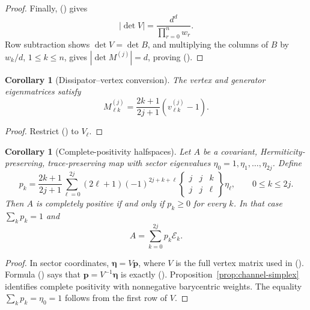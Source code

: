 \documentclass[twoside,10pt]{article}
\numberwithin{equation}{section}
\theoremstyle{slbody}
\newtheorem{corollary}[theorem]{Corollary}
\theoremstyle{definition}
\theoremstyle{remark}
\newcommand{\cE}{\mathcal E}
\renewcommand{\eqref}[1]{%
  \textup{{\normalfont(\oldstylenums{\ref{#1}}}\normalfont)}}
\begin{document}
\begin{proof}
Finally, \eqref{eq:V-factorization} gives
\begin{equation*}
 |\det V|=\frac{d^d}{\prod_{r=0}^nw_r}.
\end{equation*}
Row subtraction shows \(\det V=\det B\), and multiplying the
columns of \(B\) by \(w_k/d\), \(1\leq k\leq n\), gives
\(|\det M^{(j)}|=d\), proving \eqref{eq:M-determinant-magnitude}.
\end{proof}

\begin{corollary}[Dissipator--vertex conversion]
\label{cor:dissipator-vertex-conversion}
The vertex and generator eigenmatrices satisfy
\begin{equation}\label{eq:M-from-vertices}
 M^{(j)}_{\ell k}=\frac{2k+1}{2j+1}(v^{(j)}_{\ell k}-1).
\end{equation}
\end{corollary}

\begin{proof}
Restrict \eqref{eq:dissipator-vertex} to \(V_\ell\).
\end{proof}

\begin{corollary}[Complete-positivity halfspaces]
\label{cor:cp-halfspaces}
Let \(A\) be a covariant, Hermiticity-preserving, trace-preserving
map with sector eigenvalues
\(\eta_0=1,\eta_1,\ldots,\eta_{2j}\).  Define
\begin{equation}\label{eq:barycentric-weights}
 p_k=\frac{2k+1}{2j+1}
 \sum_{\ell=0}^{2j}(2\ell+1)(-1)^{2j+k+\ell}
 \begin{Bmatrix}j&j&k\\j&j&\ell\end{Bmatrix}\eta_\ell,
 \qquad 0\leq k\leq2j.
\end{equation}
Then \(A\) is completely positive if and only if \(p_k\geq0\) for
every \(k\).  In that case \(\sum_kp_k=1\) and
\begin{equation}\label{eq:channel-barycentric-decomposition}
 A=\sum_{k=0}^{2j}p_k\cE_k.
\end{equation}
\end{corollary}

\begin{proof}
In sector coordinates,
\(\bm\eta=V\bm p\), where \(V\) is the full vertex matrix used in
\eqref{eq:V-factorization}.  Formula \eqref{eq:V-inverse-entry} says
that \(\bm p=V^{-1}\bm\eta\) is exactly
\eqref{eq:barycentric-weights}.  Proposition~\ref{prop:channel-simplex}
identifies complete positivity with nonnegative barycentric weights.
The equality \(\sum_kp_k=\eta_0=1\) follows from the first row of
\(V\).
\end{proof}
\end{document}
